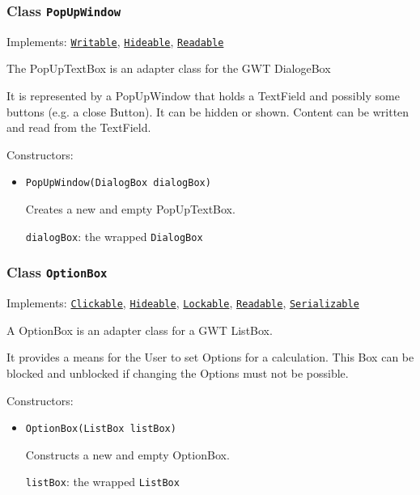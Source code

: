 \subsubsection{Class \texttt{PopUpWindow}}
\label{type:edu.kit.wavelength.client.view.webui.component.PopUpWindow}
Implements: \texttt{\hyperref[type:edu.kit.wavelength.client.view.api.Writable]{Writable}}, \texttt{\hyperref[type:edu.kit.wavelength.client.view.api.Hideable]{Hideable}}, \texttt{\hyperref[type:edu.kit.wavelength.client.view.api.Readable]{Readable}}

The PopUpTextBox is an adapter class for the GWT DialogeBox
 
 It is represented by a PopUpWindow that holds a TextField and possibly some
 buttons (e.g. a close Button). It can be hidden or shown. Content can be written and read from the
 TextField.

Constructors:
\begin{itemize}
\item \texttt{PopUpWindow(DialogBox dialogBox)}

Creates a new and empty PopUpTextBox.

\texttt{dialogBox}: the wrapped \texttt{DialogBox}

\end{itemize}

\subsubsection{Class \texttt{OptionBox}}
\label{type:edu.kit.wavelength.client.view.webui.component.OptionBox}
Implements: \texttt{\hyperref[type:edu.kit.wavelength.client.view.api.Clickable]{Clickable}}, \texttt{\hyperref[type:edu.kit.wavelength.client.view.api.Hideable]{Hideable}}, \texttt{\hyperref[type:edu.kit.wavelength.client.view.api.Lockable]{Lockable}}, \texttt{\hyperref[type:edu.kit.wavelength.client.view.api.Readable]{Readable}}, \texttt{\hyperref[type:edu.kit.wavelength.client.model.serialization.Serializable]{Serializable}}

A OptionBox is an adapter class for a GWT ListBox.
 
 It provides a means for the User to set Options for a calculation. This Box
 can be blocked and unblocked if changing the Options must not be possible.

Constructors:
\begin{itemize}
\item \texttt{OptionBox(ListBox listBox)}

Constructs a new and empty OptionBox.

\texttt{listBox}: the wrapped \texttt{ListBox}

\end{itemize}

